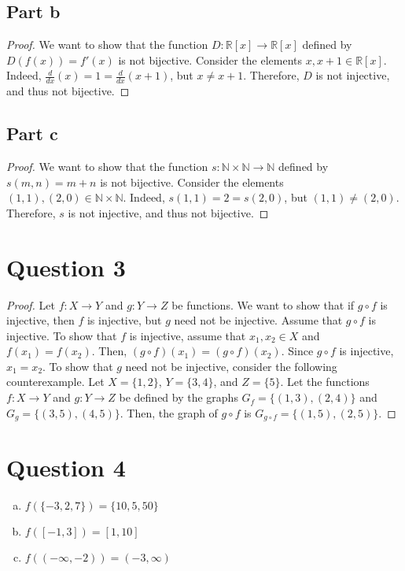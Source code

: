 \documentclass{article}
\begin{document}
\subsection*{Part b}
\begin{proof}
We want to show that the function $D: \mathbb{R}[x] \to \mathbb{R}[x]$ defined by $D(f(x)) = f'(x)$ is not bijective.
Consider the elements $x, x + 1 \in \mathbb{R}[x]$.
Indeed, $\frac{d}{dx}(x) = 1 = \frac{d}{dx}(x + 1)$, but $x \neq x + 1$.
Therefore, $D$ is not injective, and thus not bijective.
\end{proof}

\subsection*{Part c}
\begin{proof}
We want to show that the function $s: \mathbb{N} \times \mathbb{N} \to \mathbb{N}$ defined by $s(m, n) = m + n$ is not bijective.
Consider the elements $(1, 1), (2, 0) \in \mathbb{N} \times \mathbb{N}$.
Indeed, $s(1, 1) = 2 = s(2, 0)$, but $(1, 1) \neq (2, 0)$.
Therefore, $s$ is not injective, and thus not bijective.
\end{proof}

\section*{Question 3}
\begin{proof}
Let $f: X \to Y$ and $g: Y \to Z$ be functions.
We want to show that if $g \circ f$ is injective, then $f$ is injective, but $g$ need not be injective.
Assume that $g \circ f$ is injective.
To show that $f$ is injective, assume that $x_1, x_2 \in X$ and $f(x_1) = f(x_2)$.
Then, $(g \circ f)(x_1) = (g \circ f)(x_2)$.
Since $g \circ f$ is injective, $x_1 = x_2$.
To show that $g$ need not be injective, consider the following counterexample.
Let $X = \{1, 2\}$, $Y = \{3, 4\}$, and $Z = \{5\}$.
Let the functions $f: X \to Y$ and $g: Y \to Z$ be defined by the graphs $G_f = \{(1, 3), (2, 4)\}$ and $G_g = \{(3, 5), (4, 5)\}$.
Then, the graph of $g \circ f$ is $G_{g \circ f} = \{(1, 5), (2, 5)\}$.
\end{proof}

\section*{Question 4}
\begin{enumerate}[(a)]
    \item $f(\{-3, 2, 7\}) = \{10, 5, 50\}$
    \item $f([-1, 3]) = [1, 10]$
    \item $f((-\infty, -2)) = (-3, \infty)$
\end{enumerate}
\end{document}

